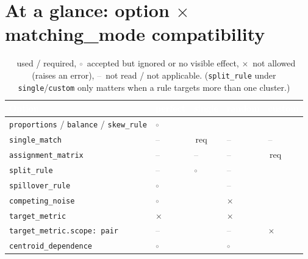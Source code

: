 \documentclass[a4paper,11pt]{article}
\newcommand{\cok}{\textcolor{okgreen}{\checkmark}} %
\newcommand{\cign}{\textcolor{gray}{$\circ$}} %
\newcommand{\cno}{\textcolor{valred}{$\times$}} %
\newcommand{\cna}{\textcolor{gray}{--}} %
\newcommand{\headrow}{\rowcolor{headblue}}
\newcommand{\hc}[1]{\textcolor{white}{\bfseries #1}}
\begin{document}
\section{At a glance: option \texorpdfstring{$\times$}{x} matching\_mode compatibility}
\begin{table}[!h]
\centering\small
\begin{threeparttable}
\begin{tabular}{@{}L{4.9cm} *{4}{>{\centering\arraybackslash}p{1.9cm}}@{}}
\toprule
\headrow
\hc{Option} & \hc{perfect} & \hc{single} & \hc{random} & \hc{custom} \\
\midrule
\texttt{proportions} / \texttt{balance} / \texttt{skew\_rule} & \cign & \cok & \cok & \cok \\
\texttt{single\_match} & \cna & \cok\,req & \cna & \cna \\
\texttt{assignment\_matrix} & \cna & \cna & \cna & \cok\,req \\
\texttt{split\_rule} & \cna & \cign & \cna & \cok \\
\texttt{spillover\_rule} & \cign & \cok & \cna & \cok \\
\texttt{competing\_noise} & \cign & \cok & \cno & \cok \\
\texttt{target\_metric} & \cno & \cok & \cno & \cok \\
\texttt{target\_metric.scope: pair} & \cna & \cok & \cna & \cno \\
\texttt{centroid\_dependence} & \cign & \cok & \cign & \cok \\
\bottomrule
\end{tabular}
\caption{\cok~used / required, \cign~accepted but ignored or no visible effect, \cno~not allowed (raises an error), \cna~not read / not applicable. (\texttt{split\_rule} under \texttt{single}/\texttt{custom} only matters when a rule targets more than one cluster.)}
\end{threeparttable}
\end{table}

\end{document}
